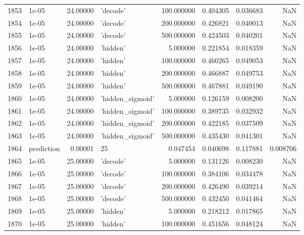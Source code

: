\documentclass[10pt,a4paper]{article}
\begin{document}
\begin{tabular}{llrlrrrr}
1853 &       1e-05 &  24.00000 &           'decode' &  100.000000 &  0.404305 &  0.036683 &       NaN \\
1854 &       1e-05 &  24.00000 &           'decode' &  200.000000 &  0.426821 &  0.040013 &       NaN \\
1855 &       1e-05 &  24.00000 &           'decode' &  500.000000 &  0.424503 &  0.040201 &       NaN \\
1856 &       1e-05 &  24.00000 &           'hidden' &    5.000000 &  0.221854 &  0.018359 &       NaN \\
1857 &       1e-05 &  24.00000 &           'hidden' &  100.000000 &  0.460265 &  0.049053 &       NaN \\
1858 &       1e-05 &  24.00000 &           'hidden' &  200.000000 &  0.466887 &  0.049753 &       NaN \\
1859 &       1e-05 &  24.00000 &           'hidden' &  500.000000 &  0.467881 &  0.049190 &       NaN \\
1860 &       1e-05 &  24.00000 &   'hidden\_sigmoid' &    5.000000 &  0.126159 &  0.008200 &       NaN \\
1861 &       1e-05 &  24.00000 &   'hidden\_sigmoid' &  100.000000 &  0.389735 &  0.032932 &       NaN \\
1862 &       1e-05 &  24.00000 &   'hidden\_sigmoid' &  200.000000 &  0.422185 &  0.037509 &       NaN \\
1863 &       1e-05 &  24.00000 &   'hidden\_sigmoid' &  500.000000 &  0.435430 &  0.041301 &       NaN \\
1864 &  prediction &   0.00001 &                 25 &    0.047454 &  0.040698 &  0.117881 &  0.008706 \\
1865 &       1e-05 &  25.00000 &           'decode' &    5.000000 &  0.131126 &  0.008230 &       NaN \\
1866 &       1e-05 &  25.00000 &           'decode' &  100.000000 &  0.384106 &  0.034478 &       NaN \\
1867 &       1e-05 &  25.00000 &           'decode' &  200.000000 &  0.426490 &  0.039214 &       NaN \\
1868 &       1e-05 &  25.00000 &           'decode' &  500.000000 &  0.432450 &  0.041464 &       NaN \\
1869 &       1e-05 &  25.00000 &           'hidden' &    5.000000 &  0.218212 &  0.017865 &       NaN \\
1870 &       1e-05 &  25.00000 &           'hidden' &  100.000000 &  0.451656 &  0.048124 &       NaN \\

\end{tabular}
\end{document}
